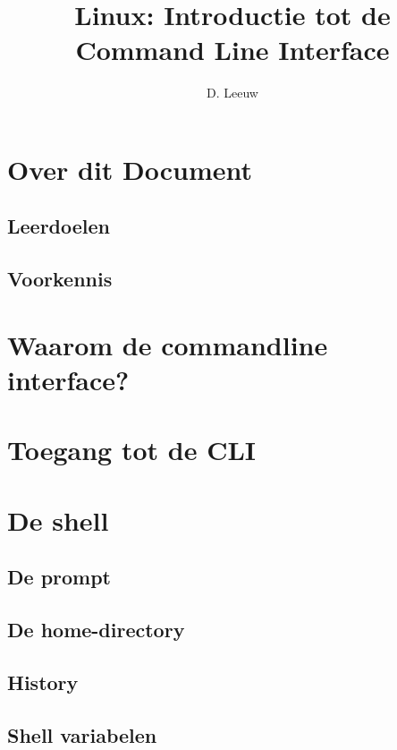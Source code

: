 \documentclass[a4paper,12pt,twoside,openright,titlepage]{article}
\author{D. Leeuw}
\title{Linux: Introductie tot de Command Line Interface}
\date{\today\\
\vfill
\raggedright
\copyright\ 2020-2025 Dennis Leeuw\\
}
\begin{document}

\maketitle


\section{Over dit Document}
\subsection{Leerdoelen}

\subsection{Voorkennis}




\section{Waarom de commandline interface?}

\section{Toegang tot de CLI}

\section{De shell}

\subsection{De prompt}

\subsection{De home-directory}

\subsection{History}

\subsection{Shell variabelen}

\end{document}
